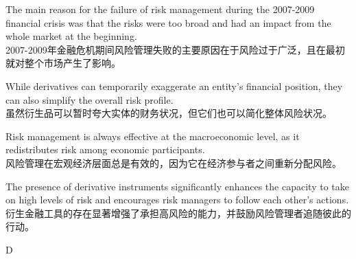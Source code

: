 \documentclass{article}
\begin{document}
\begin{choices}
    \item The main reason for the failure of risk management during the 2007-2009 financial crisis was that the risks were too broad and had an impact from the whole market at the beginning. \\
    2007-2009年金融危机期间风险管理失败的主要原因在于风险过于广泛，且在最初就对整个市场产生了影响。
    \item While derivatives can temporarily exaggerate an entity's financial position, they can also simplify the overall risk profile. \\
    虽然衍生品可以暂时夸大实体的财务状况，但它们也可以简化整体风险状况。
    \item Risk management is always effective at the macroeconomic level, as it redistributes risk among economic participants. \\
    风险管理在宏观经济层面总是有效的，因为它在经济参与者之间重新分配风险。
    \item The presence of derivative instruments significantly enhances the capacity to take on high levels of risk and encourages risk managers to follow each other's actions. \\
    衍生金融工具的存在显著增强了承担高风险的能力，并鼓励风险管理者追随彼此的行动。
\end{choices}

\begin{correctanswer}
   D
\end{correctanswer}
\end{document}
